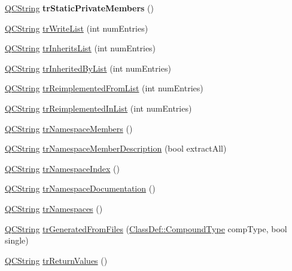 \begin{DoxyCompactItemize}
\mbox{\hyperlink{class_q_c_string}{Q\+C\+String}} {\bfseries tr\+Static\+Private\+Members} ()
\item 
\mbox{\hyperlink{class_q_c_string}{Q\+C\+String}} \mbox{\hyperlink{class_translator_italian_a13aeae67ed6cf46e1a82eb38f408d53f}{tr\+Write\+List}} (int num\+Entries)
\item 
\mbox{\hyperlink{class_q_c_string}{Q\+C\+String}} \mbox{\hyperlink{class_translator_italian_a6f2cf9c525b59c4f1ed10501f41f60df}{tr\+Inherits\+List}} (int num\+Entries)
\item 
\mbox{\hyperlink{class_q_c_string}{Q\+C\+String}} \mbox{\hyperlink{class_translator_italian_abd0a16c41457edd554440632a8950f95}{tr\+Inherited\+By\+List}} (int num\+Entries)
\item 
\mbox{\hyperlink{class_q_c_string}{Q\+C\+String}} \mbox{\hyperlink{class_translator_italian_a68bc1a8613ef23dbafb9a222830d942b}{tr\+Reimplemented\+From\+List}} (int num\+Entries)
\item 
\mbox{\hyperlink{class_q_c_string}{Q\+C\+String}} \mbox{\hyperlink{class_translator_italian_a3fc165634b3a5be4245b15a9ba37f6b1}{tr\+Reimplemented\+In\+List}} (int num\+Entries)
\item 
\mbox{\hyperlink{class_q_c_string}{Q\+C\+String}} \mbox{\hyperlink{class_translator_italian_ad97c677662c4d82af62a056c74c02438}{tr\+Namespace\+Members}} ()
\item 
\mbox{\hyperlink{class_q_c_string}{Q\+C\+String}} \mbox{\hyperlink{class_translator_italian_a89ba92afb6cb2b170b772ff328f848f8}{tr\+Namespace\+Member\+Description}} (bool extract\+All)
\item 
\mbox{\hyperlink{class_q_c_string}{Q\+C\+String}} \mbox{\hyperlink{class_translator_italian_ac79e16f18e9992121aaf8bf1b4f83ea1}{tr\+Namespace\+Index}} ()
\item 
\mbox{\hyperlink{class_q_c_string}{Q\+C\+String}} \mbox{\hyperlink{class_translator_italian_a6f3cfb6281fe8057aeabc4afd79a9067}{tr\+Namespace\+Documentation}} ()
\item 
\mbox{\hyperlink{class_q_c_string}{Q\+C\+String}} \mbox{\hyperlink{class_translator_italian_a91628f1c656997b9c9277b1f98964910}{tr\+Namespaces}} ()
\item 
\mbox{\hyperlink{class_q_c_string}{Q\+C\+String}} \mbox{\hyperlink{class_translator_italian_af10338d268d755ce3310a6b8d65f94dc}{tr\+Generated\+From\+Files}} (\mbox{\hyperlink{class_class_def_ae70cf86d35fe954a94c566fbcfc87939}{Class\+Def\+::\+Compound\+Type}} comp\+Type, bool single)
\item 
\mbox{\hyperlink{class_q_c_string}{Q\+C\+String}} \mbox{\hyperlink{class_translator_italian_a3476ae1f6424a0ef6b7d69c40497c676}{tr\+Return\+Values}} ()

\end{DoxyCompactItemize}
